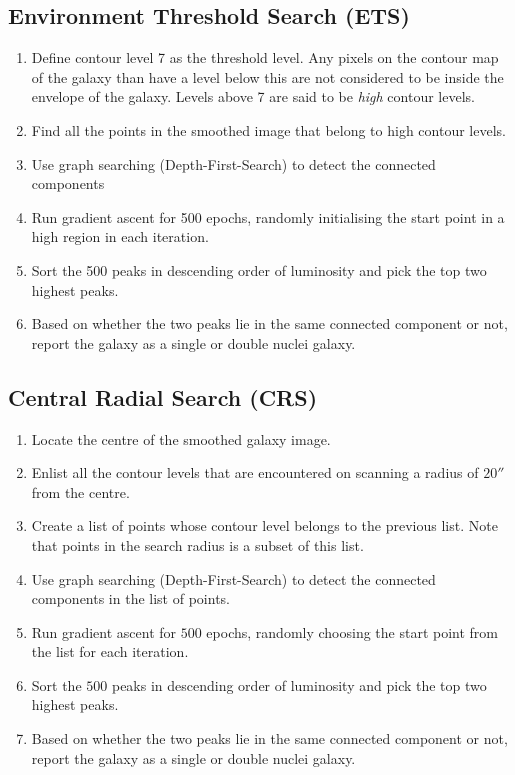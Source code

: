 \documentclass[12pt]{article}
\begin{document}
{\subsection{Environment Threshold Search (ETS)}

\begin{enumerate}
    \item Define contour level 7 as the threshold level. Any pixels on the contour map of the galaxy than have a level below this are not considered to be inside the envelope of the galaxy. Levels above 7 are said to be \textit{high} contour levels.
    \item Find all the points in the smoothed image that belong to high contour levels.
    \item Use graph searching (Depth-First-Search) to detect the connected components
    \item Run gradient ascent for 500 epochs, randomly initialising the start point in a high region in each iteration.
    \item Sort the 500 peaks in descending order of luminosity and pick the top two highest peaks.
    \item Based on whether the two peaks lie in the same connected component or not, report the galaxy as a single or double nuclei galaxy.
\end{enumerate}

\subsection{Central Radial Search (CRS)}


\begin{enumerate}
    \item Locate the centre of the smoothed galaxy image.
    \item Enlist all the contour levels that are encountered on scanning a radius of $20''$ from the centre.
    \item Create a list of points whose contour level belongs to the previous list. Note that points in the search radius is a subset of this list.
    \item Use graph searching (Depth-First-Search) to detect the connected components in the list of points.
    \item Run gradient ascent for $500$ epochs, randomly choosing the start point from the list for each iteration.
    \item Sort the $500$ peaks in descending order of luminosity and pick the top two highest peaks.
    \item Based on whether the two peaks lie in the same connected component or not, report the galaxy as a single or double nuclei galaxy.
\end{enumerate}
}
\end{document}
